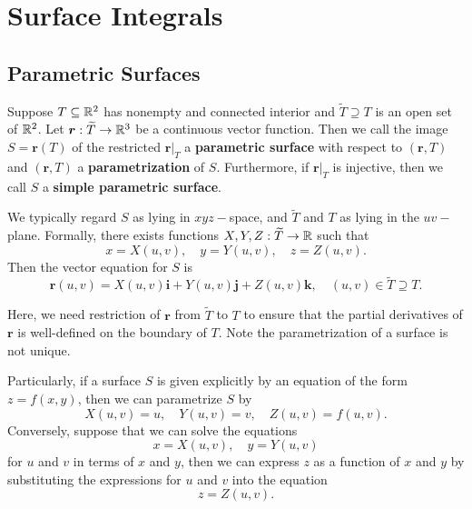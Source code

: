 \chapter{Surface Integrals}
\section{Parametric Surfaces}
\begin{definitionenv}\label{def: parametric surface}
    Suppose $T\subseteq \mathbb{R}^2$ has nonempty and connected interior and $\widetilde T \supseteq T$ is an open set of $\mathbb{R}^2$. Let $\bm r: \widetilde T\to \mathbb{R}^3$ be a continuous vector function. Then we call the image $S=\bm r(T)$ of the restricted $\bm r\big|_T$ a \textbf{parametric surface} with respect to $(\bm r, T)$ and $(\bm r,T)$ a \textbf{parametrization} of $S$. Furthermore, if $\bm r\big|_T$ is injective, then we call $S$ a \textbf{simple parametric surface}.

    We typically regard $S$ as lying in $xyz-$space, and $\widetilde T$ and $T$ as lying in the $uv-$plane. Formally, there exists functions $X,Y,Z: \widetilde T\to \mathbb{R}$ such that
    $$ x = X(u,v),\quad y = Y(u,v),\quad z = Z(u,v). $$
    Then the vector equation for $S$ is
    $$ \bm r(u,v) = X(u,v)\bm i + Y(u,v)\bm j + Z(u,v)\bm k,\quad (u,v)\in \widetilde T \supseteq T. $$
\end{definitionenv}
\begin{remarkenv}
    Here, we need restriction of $\bm r$ from $\widetilde T$ to $T$ to ensure that the partial derivatives of $\bm r$ is well-defined on the boundary of $T$. Note the parametrization of a surface is not unique.
\end{remarkenv}
\begin{exampleenv}
    Particularly, if a surface $S$ is given explicitly by an equation of the form $z = f(x,y)$, then we can parametrize $S$ by
    $$ X(u,v) = u,\quad Y(u,v) = v,\quad Z(u,v) = f(u,v). $$
    Conversely, suppose that we can solve the equations
    $$ x = X(u,v),\quad y = Y(u,v) $$
    for $u$ and $v$ in terms of $x$ and $y$, then we can express $z$ as a function of $x$ and $y$ by substituting the expressions for $u$ and $v$ into the equation
    $$ z = Z(u,v). $$
\end{exampleenv}
